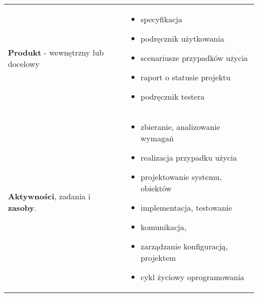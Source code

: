 \documentclass[../main.tex]{subfiles}
\begin{document}
\begin{table}[H]
\begin{center}
\begin{tabular}{  p{6cm} p{10cm}  }
                \textbf{Produkt} - wewnętrzny lub docelowy
                &
                \begin{itemize}
                    \item specyfikacja
                    \item podręcznik użytkowania
                    \item scenariusze przypadków użycia
                    \item raport o statusie projektu
                    \item podręcznik testera
                \end{itemize}
                \\
                \cmidrule(r){1-1}\cmidrule(l){2-2}
                \textbf{Aktywności}, zadania i \textbf{zasoby}.
                &
                \begin{itemize}
                    \item zbieranie, analizowanie wymagań
                    \item realizacja przypadku użycia
                    \item projektowanie systemu, obiektów
                    \item implementacja, testowanie
                    \item komunikacja,
                    \item zarządzanie konfiguracją, projektem
                    \item cykl życiowy oprogramowania
                \end{itemize}
                \\
            \end{tabular}
        \end{center}
    \end{table}
\end{document}
